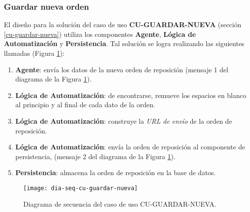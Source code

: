 \subsubsection{Guardar nueva orden}
El diseño para la solución del caso de uso \textbf{CU-GUARDAR-NUEVA} (sección \ref{cu-guardar-nueva}) utiliza los componentes \textbf{Agente}, \textbf{Lógica de Automatización} y \textbf{Persistencia}. Tal solución se logra realizando las siguientes llamadas (Figura \ref{fig:dia-seq-cu-guardar-nueva}):
\begin{enumerate}
	\item \textbf{Agente}: envía los datos de la nueva orden de reposición (mensaje 1 del diagrama de la Figura \ref{fig:dia-seq-cu-guardar-nueva}).
	\item \textbf{Lógica de Automatización}: de encontrarse, remueve los espacios en blanco al principio y al final de cada dato de la orden.
	\item \textbf{Lógica de Automatización}: construye la \textit{URL de envío} de la orden de reposición.
	\item \textbf{Lógica de Automatización}: envía la orden de reposición al componente de persistencia, (mensaje 2 del diagrama de la Figura \ref{fig:dia-seq-cu-guardar-nueva}).
	\item \textbf{Persistencia}: almacena la orden de reposición en la base de datos.
\end{enumerate}
\begin{figure}[h]
	\centering
	\texttt{[image: dia-seq-cu-guardar-nueva]}
	\caption{Diagrama de secuencia del caso de uso CU-GUARDAR-NUEVA.}
	\label{fig:dia-seq-cu-guardar-nueva}
\end{figure}
